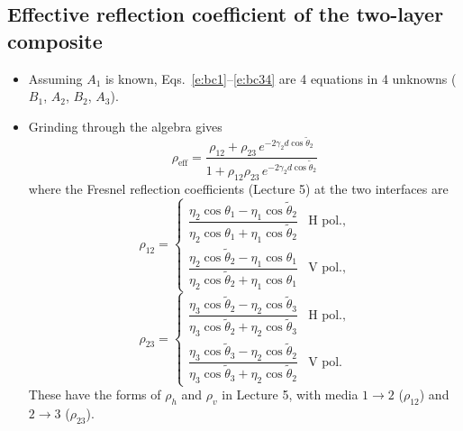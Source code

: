 \documentclass[11pt, oneside]{article}
\begin{document}
\subsection{Effective reflection coefficient of the two-layer composite}

\begin{itemize}
	\item Assuming $A_1$ is known, Eqs.~\eqref{e:bc1}--\eqref{e:bc34} are 4 equations in 4 unknowns ($B_1$, $A_2$, $B_2$, $A_3$).
	\item Grinding through the algebra gives
	\begin{equation}
		\label{e:rho}
		\boxed{\rho_\mathrm{eff} = \frac{\rho_{12} + \rho_{23}\,e^{-2\gamma_2d\cos\tilde{\theta}_2}}{1 + \rho_{12}\rho_{23}\,e^{-2\gamma_2d\cos\tilde{\theta}_2}}}
	\end{equation}
	where the Fresnel reflection coefficients (Lecture 5) at the two interfaces are
	\begin{equation}
		\label{e:rho12}
		\rho_{12} =
		\begin{cases}
			\dfrac{\eta_2\cos\theta_1 - \eta_1\cos\tilde{\theta}_2}{\eta_2\cos\theta_1 + \eta_1\cos\tilde{\theta}_2} & \text{H pol.},\\[12pt]
			\dfrac{\eta_2\cos\tilde{\theta}_2 - \eta_1\cos\theta_1}{\eta_2\cos\tilde{\theta}_2 + \eta_1\cos\theta_1} & \text{V pol.},
		\end{cases}
	\end{equation}
	\begin{equation}
		\label{e:rho23}
		\rho_{23} =
		\begin{cases}
			\dfrac{\eta_3\cos\tilde{\theta}_2 - \eta_2\cos\tilde{\theta}_3}{\eta_3\cos\tilde{\theta}_2 + \eta_2\cos\tilde{\theta}_3} & \text{H pol.},\\[12pt]
			\dfrac{\eta_3\cos\tilde{\theta}_3 - \eta_2\cos\tilde{\theta}_2}{\eta_3\cos\tilde{\theta}_3 + \eta_2\cos\tilde{\theta}_2} & \text{V pol.}
		\end{cases}
	\end{equation}
	These have the forms of $\rho_h$ and $\rho_v$ in Lecture 5, with media $1\rightarrow2$ ($\rho_{12}$) and $2\rightarrow3$ ($\rho_{23}$).
\end{itemize}
\end{document}
